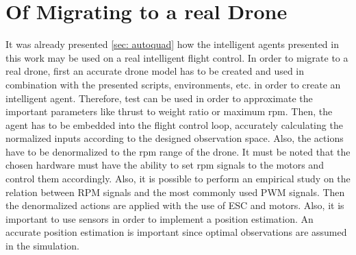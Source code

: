\section{Of Migrating to a real Drone}
It was already presented \cref{sec: autoquad} how the intelligent agents presented in 
this work may be used on a real intelligent flight control.
In order to migrate to a real drone, first an accurate drone model has to be created
and used in combination with the presented scripts, environments, etc. in order to 
create an intelligent agent.
Therefore, test can be used in order to approximate the important parameters 
like thrust to weight ratio or maximum rpm.
Then, the agent has to be embedded into the flight control loop,
accurately calculating the normalized inputs according to the designed observation space.
Also, the actions have to be denormalized to the rpm range of the drone.
It must be noted that the chosen hardware must have the ability to set rpm signals 
to the motors and control them accordingly. Also, it is possible to perform an 
empirical study on the relation between RPM signals and the most commonly used
PWM signals.
Then the denormalized actions are applied with the use of ESC and motors.
Also, it is important to use sensors in order to implement a position estimation.
An accurate position estimation is important since optimal observations are assumed
in the simulation.

